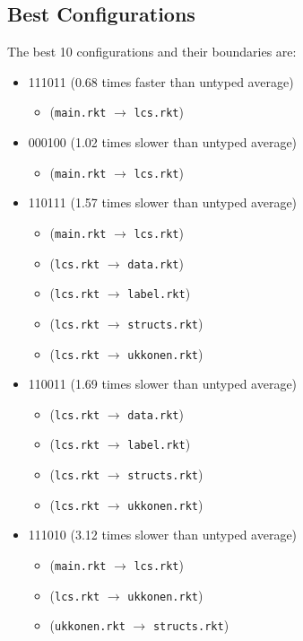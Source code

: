 \documentclass{article}
\newcommand{\mono}[1]{\texttt{#1}}
\begin{document}
\subsection{Best Configurations}
The best 10 configurations and their boundaries are:
\begin{itemize}
\item 111011 (0.68 times faster than untyped average)
  \begin{itemize}
  \item (\mono{main.rkt} $\rightarrow$ \mono{lcs.rkt})
  \end{itemize}
\item 000100 (1.02 times slower than untyped average)
  \begin{itemize}
  \item (\mono{main.rkt} $\rightarrow$ \mono{lcs.rkt})
  \end{itemize}
\item 110111 (1.57 times slower than untyped average)
  \begin{itemize}
  \item (\mono{main.rkt} $\rightarrow$ \mono{lcs.rkt})
  \item (\mono{lcs.rkt} $\rightarrow$ \mono{data.rkt})
  \item (\mono{lcs.rkt} $\rightarrow$ \mono{label.rkt})
  \item (\mono{lcs.rkt} $\rightarrow$ \mono{structs.rkt})
  \item (\mono{lcs.rkt} $\rightarrow$ \mono{ukkonen.rkt})
  \end{itemize}
\item 110011 (1.69 times slower than untyped average)
  \begin{itemize}
  \item (\mono{lcs.rkt} $\rightarrow$ \mono{data.rkt})
  \item (\mono{lcs.rkt} $\rightarrow$ \mono{label.rkt})
  \item (\mono{lcs.rkt} $\rightarrow$ \mono{structs.rkt})
  \item (\mono{lcs.rkt} $\rightarrow$ \mono{ukkonen.rkt})
  \end{itemize}
\item 111010 (3.12 times slower than untyped average)
  \begin{itemize}
  \item (\mono{main.rkt} $\rightarrow$ \mono{lcs.rkt})
  \item (\mono{lcs.rkt} $\rightarrow$ \mono{ukkonen.rkt})
  \item (\mono{ukkonen.rkt} $\rightarrow$ \mono{structs.rkt})

\end{itemize}
\end{itemize}
\end{document}

